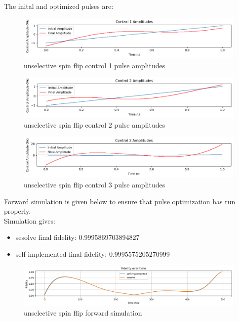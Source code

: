 \documentclass[12pt]{article}
\begin{document}
The inital and optimized pulses are: 
\begin{figure}[H]
    \centering
    \includegraphics[width=0.95\linewidth]{unselective_spin_flip_control1.png}
    \caption{unselective spin flip control 1 pulse amplitudes}
    \label{fig:unselective_spin_flip_control1}
\end{figure}
\begin{figure}[H]
    \centering
    \includegraphics[width=0.95\linewidth]{unselective_spin_flip_control2.png}
    \caption{unselective spin flip control 2 pulse amplitudes}
    \label{fig:unselective_spin_flip_control2}
\end{figure}
\begin{figure}[H]
    \centering
    \includegraphics[width=0.95\linewidth]{unselective_spin_flip_control3.png}
    \caption{unselective spin flip control 3 pulse amplitudes}
    \label{fig:unselective_spin_flip_control3}
\end{figure}

Forward simulation is given below to ensure that pulse optimization has run properly. 
\\
Simulation gives: 
\begin{itemize}
    \item sesolve final fidelity:  0.9995869703894827
    \item self-implemented final fidelity:  0.9995575205270999
\end{itemize}
\begin{figure}[H]
    \centering
    \includegraphics[width=0.95\linewidth]{unselective_spin_flip_simulation.png}
    \caption{unselective spin flip forward simulation}
    \label{fig:unselective_spin_flip_forward_simulation}
\end{figure}
\end{document}
